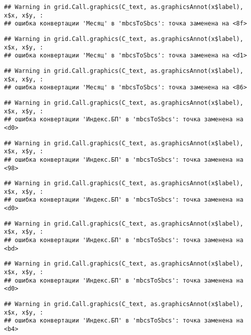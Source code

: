 \documentclass[
]{article}
\begin{document}
\begin{verbatim}
## Warning in grid.Call.graphics(C_text, as.graphicsAnnot(x$label), x$x, x$y, :
## ошибка конвертации 'Месяц' в 'mbcsToSbcs': точка заменена на <8f>
\end{verbatim}

\begin{verbatim}
## Warning in grid.Call.graphics(C_text, as.graphicsAnnot(x$label), x$x, x$y, :
## ошибка конвертации 'Месяц' в 'mbcsToSbcs': точка заменена на <d1>
\end{verbatim}

\begin{verbatim}
## Warning in grid.Call.graphics(C_text, as.graphicsAnnot(x$label), x$x, x$y, :
## ошибка конвертации 'Месяц' в 'mbcsToSbcs': точка заменена на <86>
\end{verbatim}

\begin{verbatim}
## Warning in grid.Call.graphics(C_text, as.graphicsAnnot(x$label), x$x, x$y, :
## ошибка конвертации 'Индекс.БП' в 'mbcsToSbcs': точка заменена на <d0>
\end{verbatim}

\begin{verbatim}
## Warning in grid.Call.graphics(C_text, as.graphicsAnnot(x$label), x$x, x$y, :
## ошибка конвертации 'Индекс.БП' в 'mbcsToSbcs': точка заменена на <98>
\end{verbatim}

\begin{verbatim}
## Warning in grid.Call.graphics(C_text, as.graphicsAnnot(x$label), x$x, x$y, :
## ошибка конвертации 'Индекс.БП' в 'mbcsToSbcs': точка заменена на <d0>
\end{verbatim}

\begin{verbatim}
## Warning in grid.Call.graphics(C_text, as.graphicsAnnot(x$label), x$x, x$y, :
## ошибка конвертации 'Индекс.БП' в 'mbcsToSbcs': точка заменена на <bd>
\end{verbatim}

\begin{verbatim}
## Warning in grid.Call.graphics(C_text, as.graphicsAnnot(x$label), x$x, x$y, :
## ошибка конвертации 'Индекс.БП' в 'mbcsToSbcs': точка заменена на <d0>
\end{verbatim}

\begin{verbatim}
## Warning in grid.Call.graphics(C_text, as.graphicsAnnot(x$label), x$x, x$y, :
## ошибка конвертации 'Индекс.БП' в 'mbcsToSbcs': точка заменена на <b4>
\end{verbatim}
\end{document}

